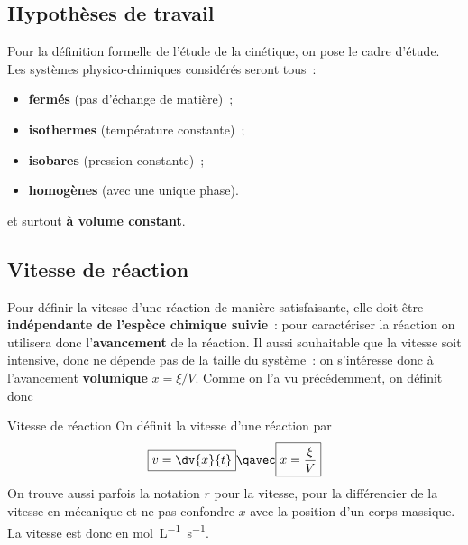 \documentclass[../main/main.tex]{subfiles}
\begin{document}
\subsection{Hypothèses de travail}
Pour la définition formelle de l'étude de la cinétique, on pose le cadre
d'étude. Les systèmes physico-chimiques considérés seront tous~:

\begin{minipage}{0.49\linewidth}
    \begin{itemize}
        \item \textbf{fermés} (pas d'échange de matière)~;
        \item \textbf{isothermes} (température constante)~;
    \end{itemize}
\end{minipage}
\hfill
\begin{minipage}{0.49\linewidth}
    \begin{itemize}
        \item \textbf{isobares} (pression constante)~;
        \item \textbf{homogènes} (avec une unique phase).
    \end{itemize}
\end{minipage}

et surtout \textbf{à volume constant}.

\subsection{Vitesse de réaction}

Pour définir la vitesse d'une réaction de manière satisfaisante, elle doit être
\textbf{indépendante de l'espèce chimique suivie}~: pour caractériser la
réaction on utilisera donc l'\textbf{avancement} de la réaction. Il aussi
souhaitable que la vitesse soit intensive, donc ne dépende pas de la taille du
système~: on s'intéresse donc à l'avancement \textbf{volumique} $x = \xi/V$.
Comme on l'a vu précédemment, on définit donc

\begin{defi}[label=def:vreac, heart, sidebyside, righthand ratio=.3]
    {Vitesse de réaction}
    On définit la vitesse d'une réaction par
    \[\boxed{v = \dv{x}{t}} \qavec \boxed{x = \frac{\xi}{V}}\]
    On trouve aussi parfois la notation $r$ pour la vitesse, pour la
    différencier de la vitesse en mécanique et ne pas confondre $x$ avec la
    position d'un corps massique.
    \tcblower
    La vitesse est donc en \si{mol.L^{-1}.s^{-1}}.
\end{defi}
\end{document}
